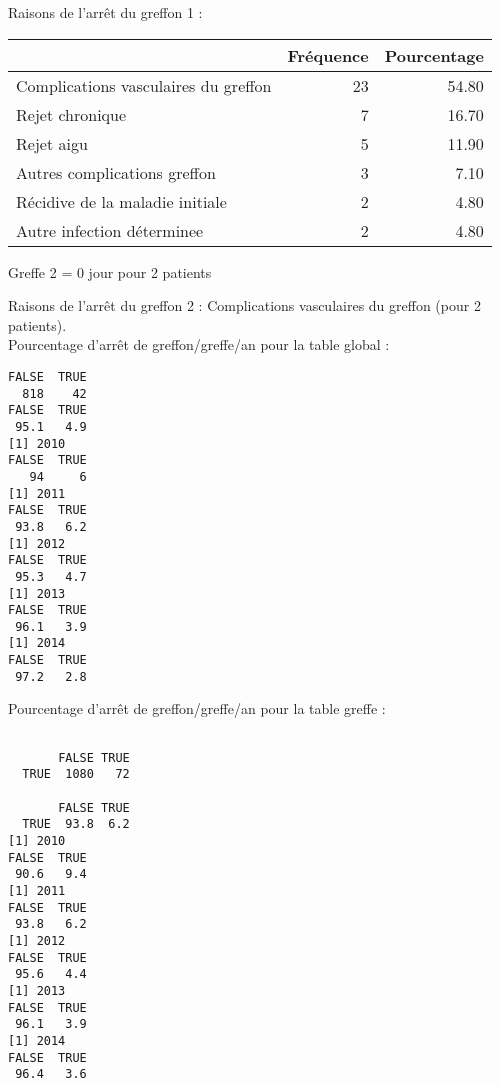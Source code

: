 \documentclass[11pt,a4paper]{article}\usepackage[]{graphicx}\usepackage[]{color}
\makeatletter
\newenvironment{kframe}{%
 \def\at@end@of@kframe{}%
 \ifinner\ifhmode%
  \def\at@end@of@kframe{\end{minipage}}%
  \begin{minipage}{\columnwidth}%
 \fi\fi%
 \def\FrameCommand##1{\hskip\@totalleftmargin \hskip-\fboxsep
 \colorbox{shadecolor}{##1}\hskip-\fboxsep
     \hskip-\linewidth \hskip-\@totalleftmargin \hskip\columnwidth}%
 \MakeFramed {\advance\hsize-\width
   \@totalleftmargin\z@ \linewidth\hsize
   \@setminipage}}%
 {\par\unskip\endMakeFramed%
 \at@end@of@kframe}
\newenvironment{knitrout}{}{} %
\makeatother
\begin{document}
Raisons de l'arrêt du greffon 1 :
\begin{table}[H]
\centering
\begin{tabular}{lrr}
  \hline
 & Fréquence & Pourcentage \\ 
  \hline
Complications vasculaires du greffon &  23 & 54.80 \\ 
  Rejet chronique &   7 & 16.70 \\ 
  Rejet aigu &   5 & 11.90 \\ 
  Autres complications greffon &   3 & 7.10 \\ 
  Récidive de la maladie initiale &   2 & 4.80 \\ 
  Autre infection déterminee &   2 & 4.80 \\ 
   \hline
\end{tabular}
\end{table}


Greffe 2 = 0 jour pour 2 patients

Raisons de l'arrêt du greffon 2 : Complications vasculaires du greffon  (pour 2 patients).
~\\

Pourcentage d'arrêt de greffon/greffe/an pour la table global :

\begin{knitrout}
\color{fgcolor}\begin{kframe}
\begin{verbatim}
FALSE  TRUE 
  818    42 
FALSE  TRUE 
 95.1   4.9 
[1] 2010
FALSE  TRUE 
   94     6 
[1] 2011
FALSE  TRUE 
 93.8   6.2 
[1] 2012
FALSE  TRUE 
 95.3   4.7 
[1] 2013
FALSE  TRUE 
 96.1   3.9 
[1] 2014
FALSE  TRUE 
 97.2   2.8 
\end{verbatim}
\end{kframe}
\end{knitrout}

Pourcentage d'arrêt de greffon/greffe/an pour la table greffe :

\begin{knitrout}
\color{fgcolor}\begin{kframe}
\begin{verbatim}
      
       FALSE TRUE
  TRUE  1080   72
      
       FALSE TRUE
  TRUE  93.8  6.2
[1] 2010
FALSE  TRUE 
 90.6   9.4 
[1] 2011
FALSE  TRUE 
 93.8   6.2 
[1] 2012
FALSE  TRUE 
 95.6   4.4 
[1] 2013
FALSE  TRUE 
 96.1   3.9 
[1] 2014
FALSE  TRUE 
 96.4   3.6 
\end{verbatim}
\end{kframe}
\end{knitrout}
\end{document}
